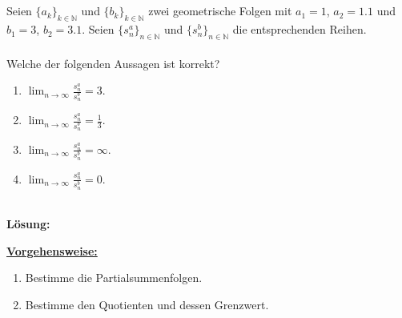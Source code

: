 \newpage

\subsection*{}
Seien $\{a_k\}_{k \in \mathbb{N}}$ und $\{b_k\}_{k \in \mathbb{N}}$ zwei geometrische Folgen mit $a_1 = 1$, $a_2= 1.1$ und $b_1 = 3$, $b_2 = 3.1$.
Seien $\{s_n^a \}_{n \in \mathbb{N}}$ und $\{s_n^b \}_{n \in \mathbb{N}}$ die entsprechenden Reihen.\\
\\
Welche der folgenden Aussagen ist korrekt? 
\renewcommand{\labelenumi}{(\alph{enumi})}
\begin{enumerate}
	\item 
	$\lim_{n \to \infty} \frac{s_n^a}{s_n^b} = 3$.
	\item
	$\lim_{n \to \infty} \frac{s_n^a}{s_n^b} = \frac{1}{3}$.
	\item
	$\lim_{n \to \infty} \frac{s_n^a}{s_n^b} = \infty$.
	\item
	$\lim_{n \to \infty} \frac{s_n^a}{s_n^b} = 0$.
\end{enumerate}
\ \\
\textbf{Lösung:}
\begin{mdframed}
\underline{\textbf{Vorgehensweise:}}
\renewcommand{\labelenumi}{\theenumi.}
\begin{enumerate}
\item Bestimme die Partialsummenfolgen.
\item Bestimme den Quotienten und dessen Grenzwert.
\end{enumerate}
\end{mdframed}

